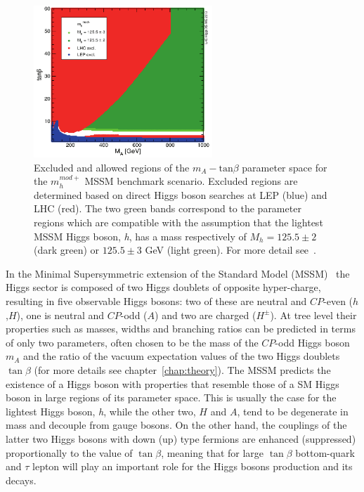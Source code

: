 \begin{figure}[tp]
     \begin{center}

            \includegraphics[width=0.6\textwidth]{figure/mh_mod.png}

    \end{center}
    \caption{Excluded and allowed regions of the $m_{A} - \text{tan}\beta$ parameter space for the  $m_{h}^{mod+}$ 
	MSSM benchmark scenario. Excluded regions are determined based on direct Higgs boson searches at LEP 
	(blue) and LHC (red). The two green 
	bands correspond to the parameter regions which are compatible with the assumption that 
	the lightest MSSM Higgs boson, \emph{h}, has a mass respectively of $M_{h} = 125.5 \pm 2$ (dark green) 
	or $125.5 \pm 3$ GeV (light green). For more detail 
	see~\cite{LHCxsec}.}
   \label{fig:mhmod}
\end{figure}

In the Minimal Supersymmetric extension of the Standard Model
(MSSM)~\cite{MSSM1, MSSM2} the Higgs sector is composed of two Higgs
doublets of opposite hyper-charge, resulting in five observable Higgs
bosons:  two of these are neutral and $CP$-even
($h$,$H$), one is neutral and $CP$-odd ($A$) and two are charged
($H^\pm$).  At tree level their properties such as masses, widths and
branching ratios can be predicted in terms of only two parameters,
often chosen to be the mass of the $CP$-odd Higgs boson $m_A$ and
the ratio of the vacuum expectation values of the two Higgs doublets
$\tan\beta$ (for more details see chapter~\ref{chap:theory}).  
The MSSM predicts the existence of a Higgs boson with properties that  
resemble those of a SM Higgs boson in large regions of its parameter space. 
This is usually the case for the lightest Higgs boson, \emph{h}, while the other two, $H$ and $A$, 
tend to be degenerate in mass and decouple from gauge bosons.
On the other hand, the couplings of the latter two Higgs bosons with down (up) type fermions are enhanced
(suppressed) proportionally to the value of $\tan\beta$, meaning that for large $\tan\beta$
bottom-quark and $\tau$ lepton will play an important role for the Higgs bosons production and its decays. 
 

